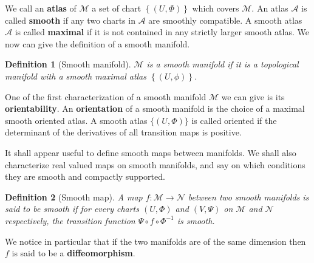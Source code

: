 \documentclass[11pt]{book}
\newcommand{\Acal}{\mathcal{A}}
\newcommand{\Mcal}{\mathcal{M}}
\newcommand{\Ncal}{\mathcal{N}}
\theoremstyle{break}
\newtheorem{definition}{Definition}[chapter]
\begin{document}


We call an \textbf{atlas} of $\Mcal$ a set of chart $\left\{ (U, \Phi) \right\}$ which covers $\Mcal$. An atlas $\Acal$ is called \textbf{smooth}  if any two charts in $\Acal$ are smoothly compatible. A smooth atlas $\Acal$ is called \textbf{maximal}  if it is not contained in any strictly larger smooth atlas. We now can give the definition of a smooth manifold.


\begin{definition}[Smooth manifold]
$\Mcal$ is a smooth manifold if it is a topological manifold with a smooth maximal atlas $\left\{(U,\phi)\right\}$.
\end{definition}


One of the first characterization of a smooth manifold $\Mcal$ we can give is its \textbf{orientability}. An \textbf{orientation} of a smooth manifold is the choice of a maximal smooth oriented atlas. A smooth atlas $\{(U,\Phi)\}$ is called oriented if the determinant of the derivatives of all transition maps is positive.


It shall appear useful to define smooth maps between manifolds. We shall also characterize real valued maps on smooth manifolds, and say on which conditions they are smooth and compactly supported.


\begin{definition}[Smooth map]
A map $f : \Mcal \to \Ncal$ between two smooth manifolds is said to be smooth if for every charts $(U,\Phi)$ and $(V,\Psi)$ on $\Mcal$ and $\Ncal$ respectively, the transition function $\Psi \circ f \circ \Phi^{-1}$ is  smooth.
\end{definition}


We notice in particular that if the two manifolds are of the same dimension then $f$ is said to be a \textbf{diffeomorphism}.
\end{document}
